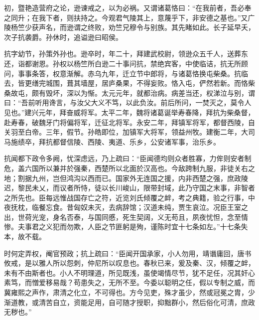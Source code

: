 \documentclass[12pt,UTF8]{ctexbook}
\begin{document}
初，暨艳造营府之论，逊谏戒之，以为必祸。又谓诸葛恪曰：“在我前者，吾必奉之同升；在我下者，则扶持之。今观君气陵其上，意蔑乎下，非安德之基也。”又广陵杨竺少获声名，而逊谓之终败，劝竺兄穆令与别族。其先睹如此。长子延早夭，次子抗袭爵。孙休时，追谥逊曰昭侯。

抗字幼节，孙策外孙也。逊卒时，年二十，拜建武校尉，领逊众五千人，送葬东还，诣都谢恩。孙权以杨竺所白逊二十事问抗，禁绝宾客，中使临诘，抗无所顾问，事事条答，权意渐解。赤乌九年，迁立节中郎将，与诸葛恪换屯柴桑。抗临去，皆更缮完城围，葺其墙屋，居庐桑果，不得妄败。恪入屯，俨然若新。而恪柴桑故屯，颇有毁坏，深以为惭。太元元年，就都治病。病差当还，权涕泣与别，谓曰：“吾前听用谗言，与汝父大义不笃，以此负汝。前后所问，一焚灭之，莫令人见也。”建兴元年，拜奋威将军。太平二年，魏将诸葛诞举寿春降，拜抗为柴桑督，赴寿春，破魏牙门将偏将军，迁征北将军。永安二年，拜镇军将军，都督西陵，自关羽至白帝。三年，假节。孙皓即位，加镇军大将军，领益州牧。建衡二年，大司马施绩卒，拜抗都督信陵、西陵、夷道、乐乡，公安诸军事，治乐乡。

抗闻都下政令多阙，忧深虑远，乃上疏曰：“臣闻德均则众者胜寡，力侔则安者制危，盖六国所以兼并於强秦，西楚所以北面於汉高也。今敌跨制九服，非徒关右之地；割据九州，岂但鸿沟以西而已。国家外无连国之援，内非西楚之强，庶政陵迟，黎民未乂，而议者所恃，徒以长川峻山，限带封域，此乃守国之末事，非智者之所先也。臣每远惟战国存亡之符，近览刘氏倾覆之衅，考之典籍，验之行事，中夜抚枕，临餐忘食。昔匈奴未灭，去病辞馆；汉道未纯，贾生哀泣。况臣王室之出，世荷光宠，身名否泰，与国同慼，死生契阔，义无苟且，夙夜忧怛，念至情惨。夫事君之义犯而勿欺，人臣之节匪躬是殉，谨陈时宜十七条如左。”十七条失本，故不载。

时何定弄权，阉官预政；抗上疏曰：“臣闻开国承家，小人勿用，靖谮庸回，唐书攸戒，是以雅人所以怨刺，仲尼所以叹息也。春秋已来，爰及秦、汉，倾覆之衅，未有不由斯者也。小人不明理道，所见既浅，虽使竭情尽节，犹不足任，况其奸心素笃，而憎爱移易哉？苟患失之，无所不至。今委以聪明之任，假以专制之威，而冀雍熙之声作，肃清之化立，不可得也。方今见吏，殊才虽少，然或冠冕之胄，少渐道教，或清苦自立，资能足用，自可随才授职，抑黜群小，然后俗化可清，庶政无秽也。”
\end{document}
